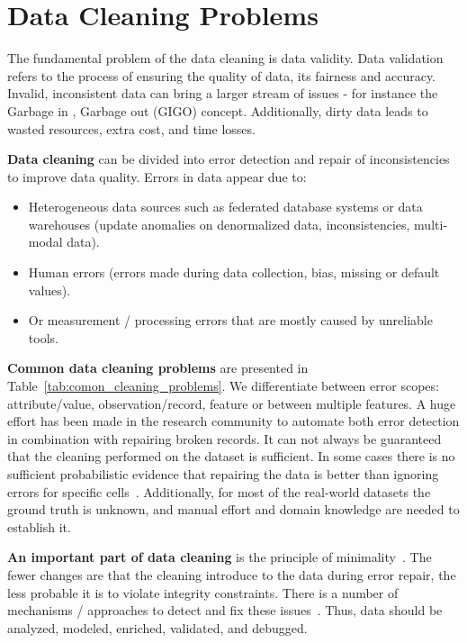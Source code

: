 
\section{Data Cleaning Problems}
\label{sec:data_cleaning_problems}

The fundamental problem of the data cleaning is data validity.
Data validation refers to the process of ensuring the quality of data, its fairness and accuracy. 
Invalid, inconsistent data can bring a larger stream of issues - for instance the Garbage in , Garbage out (GIGO) concept.
Additionally, dirty data leads to wasted resources, extra cost, and time losses.

\textbf{Data cleaning} can be divided into error detection and repair of inconsistencies to improve data quality.
Errors in data appear due to:

\begin{itemize}
    \item Heterogeneous data sources such as federated database systems or
    data warehouses (update anomalies on denormalized data, inconsistencies, multi-modal data).
    \item Human errors (errors made during data collection, bias, missing or default values).
    \item Or measurement / processing errors that are mostly caused by unreliable tools.
\end{itemize}

\textbf{Common data cleaning problems} are presented in Table~\ref{tab:comon_cleaning_problems}.
We differentiate between error scopes: attribute/value, observation/record, feature or between multiple features. 
A huge effort has been made in the research community to automate both error detection in combination with  repairing broken records. 
It can not always be guaranteed that the cleaning performed on the dataset is sufficient.
In some cases there is no sufficient probabilistic evidence that repairing the data is better than ignoring errors for specific cells~\cite{RekatsinasCIR2017}. 
Additionally, for most of the real-world datasets the ground truth is unknown, and manual effort and domain knowledge are needed to establish it.

\textbf{An important part of data cleaning} is the principle of minimality~\cite{minimality, RekatsinasCIR2017}.
The fewer changes are that the cleaning introduce to the data during error repair, the less probable it is to violate integrity constraints.
There is a number of mechanisms / approaches to detect and fix these issues~\cite{data_cleaning_methods}.
Thus, data should be analyzed, modeled, enriched, validated, and debugged.

